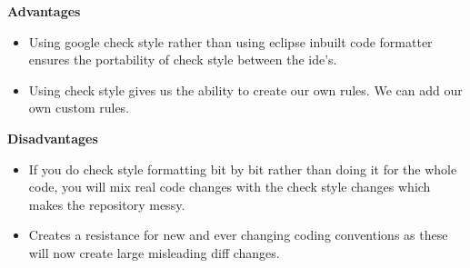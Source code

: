 \documentclass[12pt]{report}
\begin{document}
 \textbf{Advantages}
 \begin{itemize}
     \item Using google check style rather than using eclipse inbuilt code formatter  ensures the portability of check style between the ide's. 
     \item Using check style gives us the ability to create our own rules. We can add our own custom rules.
 \end{itemize}
 
  \textbf{Disadvantages}
  \begin{itemize} 
    \item If you do check style formatting bit by bit rather than doing it for the whole code, you will mix real code changes with the check style changes which makes the repository messy.
    \item Creates a resistance for  new and ever changing coding conventions as these will now create large misleading diff changes.
  \end{itemize}
\end{document}
